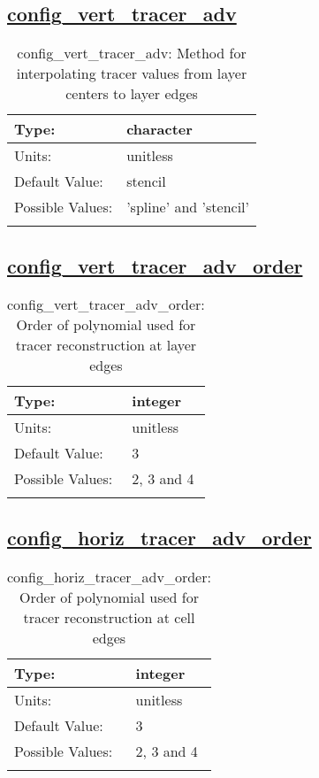 \subsection[config\_vert\_tracer\_adv]{\hyperref[sec:nm_tab_advection]{config\_vert\_tracer\_adv}}
\label{subsec:nm_sec_config_vert_tracer_adv}
\begin{center}
\begin{longtable}{| p{2.0in} || p{4.0in} |}
    \hline
    Type: & character \\
    \hline
    Units: & \si{unitless} \\
    \hline
    Default Value: & stencil \\
    \hline
    Possible Values: & 'spline' and 'stencil' \\
    \hline
    \caption{config\_vert\_tracer\_adv: Method for interpolating tracer values from layer centers to layer edges}
\end{longtable}
\end{center}
\subsection[config\_vert\_tracer\_adv\_order]{\hyperref[sec:nm_tab_advection]{config\_vert\_tracer\_adv\_order}}
\label{subsec:nm_sec_config_vert_tracer_adv_order}
\begin{center}
\begin{longtable}{| p{2.0in} || p{4.0in} |}
    \hline
    Type: & integer \\
    \hline
    Units: & \si{unitless} \\
    \hline
    Default Value: & 3 \\
    \hline
    Possible Values: & 2, 3 and 4 \\
    \hline
    \caption{config\_vert\_tracer\_adv\_order: Order of polynomial used for tracer reconstruction at layer edges}
\end{longtable}
\end{center}
\subsection[config\_horiz\_tracer\_adv\_order]{\hyperref[sec:nm_tab_advection]{config\_horiz\_tracer\_adv\_order}}
\label{subsec:nm_sec_config_horiz_tracer_adv_order}
\begin{center}
\begin{longtable}{| p{2.0in} || p{4.0in} |}
    \hline
    Type: & integer \\
    \hline
    Units: & \si{unitless} \\
    \hline
    Default Value: & 3 \\
    \hline
    Possible Values: & 2, 3 and 4 \\
    \hline
    \caption{config\_horiz\_tracer\_adv\_order: Order of polynomial used for tracer reconstruction at cell edges}
\end{longtable}
\end{center}

